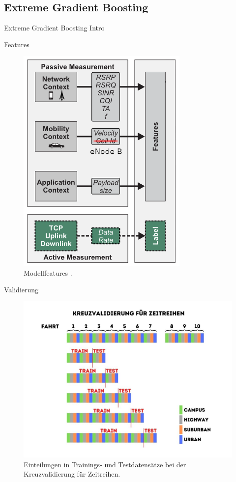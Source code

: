 \subsection{Extreme Gradient Boosting}

\begin{frame}{Extreme Gradient Boosting}
    Intro
\end{frame}

\begin{frame}{Features}
    \begin{figure}[h]
		\centering
		\includegraphics[height=0.75\textheight]{grafiken/features}
		\caption{Modellfeatures \cite{IEEE}.}
		\label{features}
	\end{figure}
\end{frame}

\begin{frame}{Validierung}
	\begin{figure}[h]
		\centering
		\includegraphics[scale=0.33]{kreuzvalidierung}
		\caption{Einteilungen in Trainings- und Testdatensätze bei der Kreuzvalidierung für Zeitreihen.}
		\label{kreuzvalidierung}
	\end{figure}
\end{frame}


